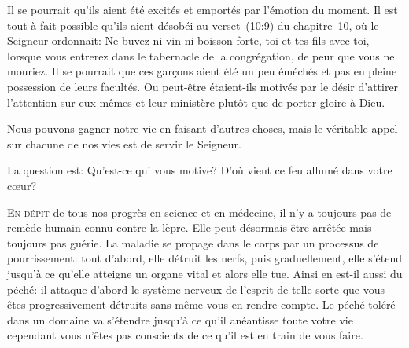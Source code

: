 Il se pourrait qu'ils aient été excités et emportés par l'émotion du moment.
 Il est tout à fait possible qu'ils aient désobéi au verset~(10:9) du chapitre~10,
 où le Seigneur ordonnait:
 \Og Ne buvez ni vin ni boisson forte, toi et tes fils avec toi,
 lorsque vous entrerez dans le tabernacle de la congrégation,
 de peur que vous ne mouriez. \Fg{}
 Il se pourrait que ces gar\c{c}ons aient été un peu éméchés
 et pas en pleine possession de leurs facultés.
 Ou peut-être étaient-ils motivés par le désir d'attirer
 l'attention sur eux-mêmes et leur ministère plutôt que de porter gloire à Dieu.


Nous pouvons gagner notre vie en faisant d'autres choses,
 mais le véritable appel sur chacune de nos vies est de servir le Seigneur.

La question est: Qu'est-ce qui vous motive?
 D'où vient ce feu allumé dans votre c\oe{}ur? 

\dvrule







\lettrine{E}{n dépit} de tous nos progrès en science et en médecine,
 il n'y a toujours pas de remède humain connu contre la lèpre.
 Elle peut désormais être arrêtée mais toujours pas guérie.
 La maladie se propage dans le corps par un processus de pourrissement:
 tout d'abord, elle détruit les nerfs,
 puis graduellement, elle s'étend jusqu'à ce qu'elle atteigne
 un organe vital et alors elle tue.
 Ainsi en est-il aussi du péché: il attaque d'abord le système nerveux
 de l'esprit de telle sorte que vous êtes progressivement détruits
 sans même vous en rendre compte.
 Le péché toléré dans un domaine va s'étendre jusqu'à ce qu'il anéantisse
 toute votre vie \ocadr{}cependant vous n'êtes pas conscients
 de ce qu'il est en train de vous faire. 

